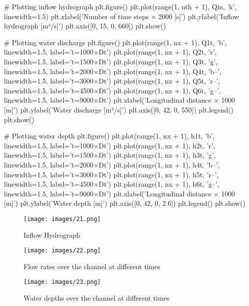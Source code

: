 \documentclass{article}
\begin{document}
\begin{ColoredVerbatim}[formatcom=\color{red}]
    # Plotting inflow hydrograph
    plt.figure()
    plt.plot(range(1, nth + 1), Qin, 'k', linewidth=1.5)
    plt.xlabel('Number of time steps × 2000 [s]')
    plt.ylabel('Inflow hydrograph [m³/s]')
    plt.axis([0, 15, 0, 660])
    plt.show()
    
    # Plotting water discharge
    plt.figure()
    plt.plot(range(1, nx + 1), Q1t, 'b', linewidth=1.5, label='t=1000×Dt')
    plt.plot(range(1, nx + 1), Q2t, 'r', linewidth=1.5, label='t=1500×Dt')
    plt.plot(range(1, nx + 1), Q3t, 'g', linewidth=1.5, label='t=2000×Dt')
    plt.plot(range(1, nx + 1), Q4t, 'b--', linewidth=1.5, label='t=3000×Dt')
    plt.plot(range(1, nx + 1), Q5t, 'r--', linewidth=1.5, label='t=4500×Dt')
    plt.plot(range(1, nx + 1), Q6t, 'g--', linewidth=1.5, label='t=9000×Dt')
    plt.xlabel('Longitudinal distance × 1000 [m]')
    plt.ylabel('Water discharge [m³/s]')
    plt.axis([0, 42, 0, 550])
    plt.legend()
    plt.show()
    
    # Plotting water depth
    plt.figure()
    plt.plot(range(1, nx + 1), h1t, 'b', linewidth=1.5, label='t=1000×Dt')
    plt.plot(range(1, nx + 1), h2t, 'r', linewidth=1.5, label='t=1500×Dt')
    plt.plot(range(1, nx + 1), h3t, 'g', linewidth=1.5, label='t=2000×Dt')
    plt.plot(range(1, nx + 1), h4t, 'b--', linewidth=1.5, label='t=3000×Dt')
    plt.plot(range(1, nx + 1), h5t, 'r--', linewidth=1.5, label='t=4500×Dt')
    plt.plot(range(1, nx + 1), h6t, 'g--', linewidth=1.5, label='t=9000×Dt')
    plt.xlabel('Longitudinal distance × 1000 [m]')
    plt.ylabel('Water depth [m]')
    plt.axis([0, 42, 0, 2.6])
    plt.legend()
    plt.show()

\end{ColoredVerbatim}

\begin{figure}[H]
    \centering
    \texttt{[image: images/21.png]}
    \caption{Inflow Hydrograph}
    \label{fig:sample}
\end{figure}    
    
\begin{figure}[H]
    \centering
    \texttt{[image: images/22.png]}
    \caption{Flow rates over the channel at different times}
    \label{fig:sample}
\end{figure}

\begin{figure}[H]
    \centering
    \texttt{[image: images/23.png]}
    \caption{Water depths over the channel at different times}
    \label{fig:sample}
\end{figure}
\end{document}
